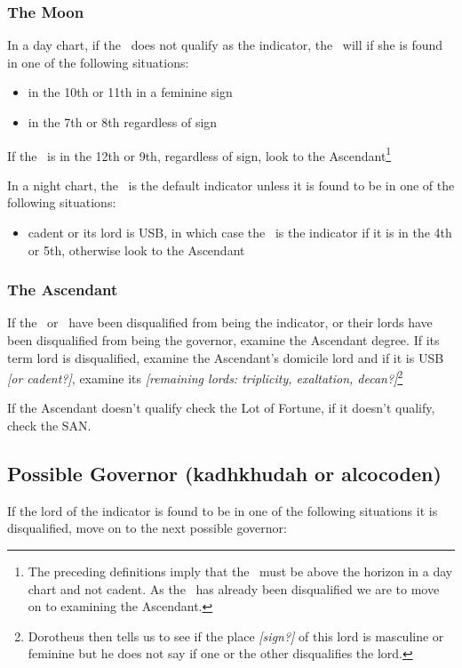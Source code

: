 \subsubsection{The Moon}
\vspace{-0.5em}
In a day chart, if the \Sun\, does not qualify as the indicator, the \Moon\, will if she is found in one of the following situations:
\begin{itemize}[topsep=0em,itemsep=0em]
\item {}in the 10th or 11th in a feminine sign
\item {}in the 7th or 8th regardless of sign
\end{itemize}
If the \Moon\, is in the 12th or 9th, regardless of sign, look to the Ascendant\footnote{The preceding definitions imply that the \Moon\, must be above the horizon in a day chart and not cadent. As the \Sun\, has already been disqualified we are to move on to examining the Ascendant.}

In a night chart, the \Moon\, is the default indicator unless it is found to be in one of the following situations:
\begin{itemize}[topsep=0em,itemsep=0em]
\item {}cadent or its lord is USB, in which case the \Sun\, is the indicator if it is in the 4th or 5th, otherwise look to the Ascendant
\end{itemize}

\subsubsection{The Ascendant}
If the \Sun\, or \Moon\, have been disqualified from being the indicator, or their lords have been disqualified from being the governor, examine the Ascendant degree. If its term lord is disqualified, examine the Ascendant's domicile lord and  if it is USB \textsl{[or cadent?]}, examine its \textsl{[remaining lords: triplicity, exaltation, decan?]}\footnote{Dorotheus then tells us to see if the place \textsl{[sign?]} of this lord is masculine or feminine but he does not say if one or the other disqualifies the lord.}

If  the Ascendant doesn't qualify check the Lot of Fortune, if it doesn't qualify, check the SAN.

\vspace{-0.5em}
\subsection{Possible Governor (kadhkhudah or alcocoden)}
If the lord of the indicator is found to be in one of the following situations  it is disqualified, move on to the next possible governor:

